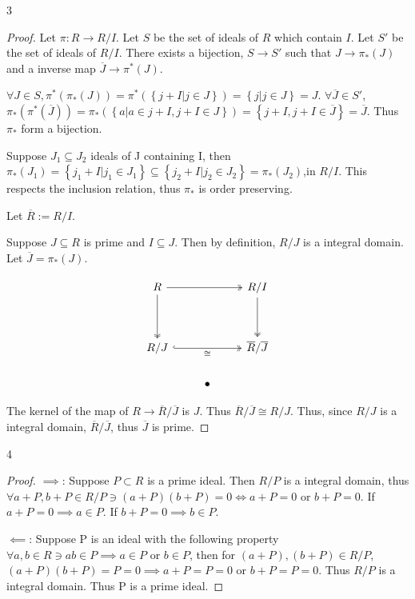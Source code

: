 \documentclass{article}
\begin{document}
\bigskip

\begin{PROB}{3}\label{Problem 3.}
\end{PROB}
\begin{proof}

    Let $\pi: R \to R / I$.  
    Let $S$ be the set of ideals of $R$ which contain $I$. Let $S'$ be the set of ideals of $R / I$. There exists a bijection, $S \to S'$ such that $J \to \pi_*(J)$ and a inverse map $\overline{J} \to \pi^*(J)$.
    
    $\forall J \in S, \pi^*(\pi_*(J)) = \pi^*(\left\{ j + I | j \in J \right\}) = \left\{ j | j \in J \right\} = J$. $\forall \overline{J} \in S'$, $\pi_*(\pi^*(\overline{J})) = \pi_*(\left\{ a | a \in j + I, j + I \in J \right\}) = \left\{ j + I, j + I \in \overline{J} \right\} = \overline{J}$. Thus $\pi_*$ form a bijection. 
    
    Suppose $J_1 \subseteq J_2$ ideals of J containing I, then $\pi_*(J_1) = \left\{ j_1 + I | j_1 \in J_1 \right\} \subseteq \left\{ j_2 + I | j_2 \in J_2\right\} = \pi_*(J_2)$,in $R / I$. This respects the inclusion relation, thus $\pi_*$ is order preserving.
    
    
    Let $\overline{R} := R / I$. 

    Suppose $J \subseteq R$ is prime and $I \subseteq J$. Then by definition, $R / J$ is a integral domain. Let $\overline{J} = \pi_*(J)$. 
    
    
    \[\begin{tikzcd}
        R && {R/I} \\
        \\
        {R/J} && {\overline{R}/\overline{J}} \\
        & \bullet
        \arrow[two heads, from=1-1, to=1-3]
        \arrow[two heads, from=1-1, to=3-1]
        \arrow[two heads, from=1-3, to=3-3]
        \arrow["\cong"', hook, two heads, from=3-1, to=3-3]
    \end{tikzcd}\]

    The kernel of the map of $R \to \overline{R} / \overline{J}$ is $J$. Thus $\overline{R} / \overline{J} \cong R / J$. Thus, since $R / J$ is a integral domain, $\overline{R} / \overline{J}$, thus $\overline{J}$ is prime.       
\end{proof}

\bigskip

\begin{PROB}{4}\label{Problem 4.}
\end{PROB}
\begin{proof}
    $\implies$: Suppose $P \subset R$  is a prime ideal. Then $R / P$ is a integral domain, thus $\forall a + P, b + P \in R / P \ni (a + P)(b + P) = 0 \iff a + P = 0 $ or $b + P = 0$. If $a + P = 0 \implies a \in P$. If $b + P = 0 \implies b \in P$.
    
    $\impliedby$: Suppose P is an ideal with the following property $\forall a, b \in R \ni ab \in P \implies a \in P$ or $b \in P$, then for $(a + P), (b + P) \in R / P$, $(a + P)(b + P) = P = 0 \implies a + P = P = 0$ or $b + P = P = 0$. Thus $R / P$ is a integral domain. Thus P is a prime ideal.    
\end{proof}
\end{document}
